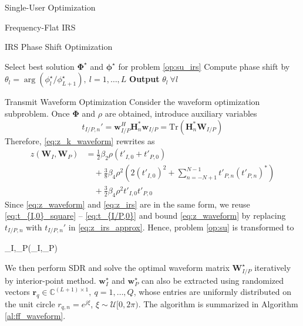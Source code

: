 \documentclass{IEEEtran}
\begin{document}
\begin{section}{Single-User Optimization}
\begin{subsection}{Frequency-Flat IRS}
\begin{subsubsection}{IRS Phase Shift Optimization}
\begin{algorithm}
\begin{algorithmic}[1]
					\State Select best solution $\boldsymbol{\Phi}^\star$ and $\boldsymbol{\phi}^\star$ for problem \ref{op:su_irs}
					\State Compute phase shift by $\theta_l=\arg(\phi_l^\star/\phi_{L+1}^\star), \ l=1,\dots,L$
					\State \textbf{Output} $\theta_l \ \forall l$
				\end{algorithmic}
			\end{algorithm}
		\end{subsubsection}

		\begin{subsubsection}{Transmit Waveform Optimization}
			Consider the waveform optimization subproblem. Once $\boldsymbol{\Phi}$ and $\rho$ are obtained, introduce auxiliary variables
			\begin{equation}\label{eq:t'}
				t_{I/P,n}' = \boldsymbol{w}_{I/P}^H \boldsymbol{H}_n^* \boldsymbol{w}_{I/P} = \mathrm{Tr}(\boldsymbol{H}_n^*\boldsymbol{W}_{I/P})
			\end{equation}
			Therefore, \ref{eq:z_k_waveform} rewrites as
			\begin{equation}\label{eq:z_waveform}
				\begin{split}
					z(\boldsymbol{W}_I,\boldsymbol{W}_P)
					&=\frac{1}{2} \beta_2 \rho (t'_{I,0}+t'_{P,0})\\
					&\quad+\frac{3}{8} \beta_4 \rho^2 \left(2(t'_{I,0})^2 + \sum_{n=-N+1}^{N-1}{t'_{P,n}(t'_{P,n})^*}\right)\\
					&\quad+\frac{3}{2} \beta_4 \rho^2 t'_{I,0}t'_{P,0}
				\end{split}
			\end{equation}
			Since \ref{eq:z_waveform} and \ref{eq:z_irs} are in the same form, we reuse \ref{eq:t_{I,0}_square} -- \ref{eq:t_{I/P,0}} and bound \ref{eq:z_waveform} by replacing $t_{I/P,n}$ with $t_{I/P,n}'$ in \ref{eq:z_irs_approx}. Hence, problem \ref{op:su} is transformed to
			\begin{maxi!}
				{\boldsymbol{W}_I,_P}{(\boldsymbol{W}_I,_P)}{\label{op:su_waveform}}{\label{eq:su_waveform_target}}
			\end{maxi!}
			We then perform SDR and solve the optimal waveform matrix $\boldsymbol{W}_{I/P}^{\star}$ iteratively by interior-point method. $\boldsymbol{w}_I^{\star}$ and $\boldsymbol{w}_P^{\star}$ can also be extracted using randomized vectors $\boldsymbol{r}_q \in \mathbb{C}^{(L+1) \times 1}, \ q=1,\dots,Q$, whose entries are uniformly distributed on the unit circle $r_{q,n}=e^{j\xi}$, $\xi \sim \mathcal{U}[0,2\pi)$. The algorithm is summarized in Algorithm \ref{al:ff_waveform}.

\end{subsubsection}
\end{subsection}
\end{section}
\end{document}
